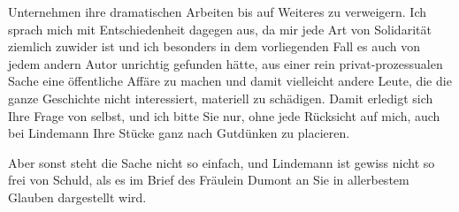                   Unternehmen\introOben{} ihre dramatischen Arbeiten bis auf Weiteres zu verweigern. Ich
               sprach mich mit Entschiedenheit dagegen aus, da mir jede Art von Solidarität ziemlich
               zuwider ist und ich besonders in dem vorliegenden Fall es auch von jedem andern Autor
               unrichtig gefunden hätte, aus einer rein \introOben{}privat-\introOben{}prozessualen Sache eine \introOben{}öffentliche\introOben{} Affäre zu
               machen und damit vielleicht  andere Leute, die
               die ganze Geschichte nicht interessiert, materiell zu schädigen. Damit erledigt sich
               Ihre Frage von selbst, und ich bit{\pb}te Sie nur, ohne jede
               Rücksicht auf mich, auch bei Lindemann Ihre
               Stücke ganz nach Gutdünken zu placieren.\pend
           
\pstart
           Aber sonst steht die Sache nicht so einfach, und Lindemann ist gewiss nicht so frei von Schuld, als es im Brief des Fräulein
                  Dumont an Sie in allerbestem Glauben
               dargestellt wird.\pend
           
